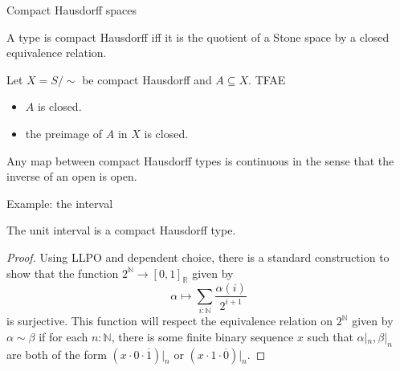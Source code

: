 \documentclass{beamer}
\begin{document}
\begin{frame}{Compact Hausdorff spaces}
  \begin{definition}
    A type is compact Hausdorff iff it is the quotient of a 
    Stone space by a closed equivalence relation. 
  \end{definition}
  \pause
  \begin{lemma}
    Let $X = S / \sim $ be compact Hausdorff and $A\subseteq X$. TFAE
    \begin{itemize}
      \item $A$ is closed. 
      \item the preimage of $A$ in $X$ is closed. 
    \end{itemize}
\end{lemma}
\pause
  \begin{corollary}
    Any map between compact Hausdorff types is 
    continuous in the sense that the inverse of an open is open. 
  \end{corollary}
\end{frame} 
\begin{frame}{Example: the interval}
  \begin{lemma}
    The unit interval is a compact Hausdorff type. 
  \end{lemma}
  \pause
  \begin{proof}
    Using LLPO and dependent choice, 
    \pause 
    there is a standard construction 
    to show that the function $2^\mathbb N \to [0,1]_\mathbb R$ given by 
    $$\alpha\mapsto \sum\limits_{i:\mathbb N} \frac{\alpha(i)}{2^{i+1}}$$
    is surjective.
    \pause
    This function will respect the equivalence relation on $2^\mathbb N$ given by \pause
    $\alpha \sim \beta$ if for each $n:\mathbb N$, 
    there is some finite binary sequence $x$ such that 
    $\alpha|_n, \beta|_n$ are both of the form 
    $(x \cdot 0 \cdot \overline 1)|_n$ or $(x \cdot 1 \cdot \overline 0)|_n$.
  \end{proof}
\end{frame}
\end{document}

